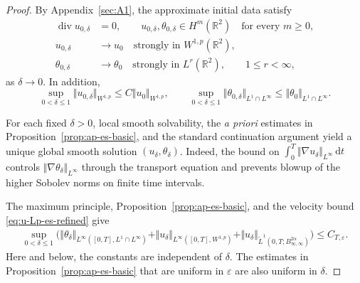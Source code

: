 \documentclass[reqno,11pt,a4paper]{amsart}
\newcommand{\dd}{\mathrm{d}}
\begin{document}
\begin{proof}
By Appendix~\ref{sec:A1}, the approximate initial data satisfy
\begin{align}
  \operatorname{div}u_{0,\delta}&=0,
  \qquad
  u_{0,\delta},\theta_{0,\delta}\in H^m(\mathbb R^2)
  \quad\text{for every }m\geq0,
  \label{regularized-main1-smooth}\\
  u_{0,\delta}&\longrightarrow u_0
  \quad\text{strongly in }W^{1,p}(\mathbb R^2),
  \label{regularized-main1-u-conv}\\
  \theta_{0,\delta}&\longrightarrow\theta_0
  \quad\text{strongly in }L^r(\mathbb R^2),
  \qquad 1\leq r<\infty,
  \label{regularized-main1-theta-conv}
\end{align}
as $\delta\to0$.
In addition,
\[
  \sup_{0<\delta\leq1}
  \Vert u_{0,\delta}\Vert _{W^{1,p}}
  \leq C\Vert u_0\Vert _{W^{1,p}},
  \qquad
  \sup_{0<\delta\leq1}
  \Vert \theta_{0,\delta}\Vert _{L^1\cap L^\infty}
  \leq\Vert \theta_0\Vert _{L^1\cap L^\infty}.
\]

For each fixed $\delta>0$, local smooth solvability,
the {\it{a priori}} estimates in
Proposition~\ref{prop:ap-es-basic}, and the standard
continuation argument yield a unique global smooth solution
$(u_\delta,\theta_\delta)$.
Indeed, the bound on
$\int_0^T\Vert \nabla u_\delta\Vert _{L^\infty}\,\dd t$
controls $\Vert \nabla\theta_\delta\Vert _{L^\infty}$ through the
transport equation and prevents blowup of the higher
Sobolev norms on finite time intervals.

The maximum principle,
Proposition~\ref{prop:ap-es-basic}, and
the velocity bound \eqref{eq:u-Lp-es-refined} give
\begin{equation}\label{regularized-main1-basic-bounds}
\begin{aligned}
  \sup_{0<\delta\leq1}\Big(
    \Vert \theta_\delta\Vert _{L^\infty([0,T],L^1\cap L^\infty)}
    +\Vert u_\delta\Vert _{L^\infty([0,T],W^{1,p})}
    +\Vert u_\delta\Vert _{\widetilde L^1
      (0,T;B_{\infty,\infty}^{2\alpha})}
  \Big)
  \leq C_{T,\varepsilon}.
\end{aligned}
\end{equation}
Here and below, the constants are independent of $\delta$.
The estimates in Proposition~\ref{prop:ap-es-basic}
that are uniform in $\varepsilon$ are also uniform in $\delta$.


\end{proof}
\end{document}
